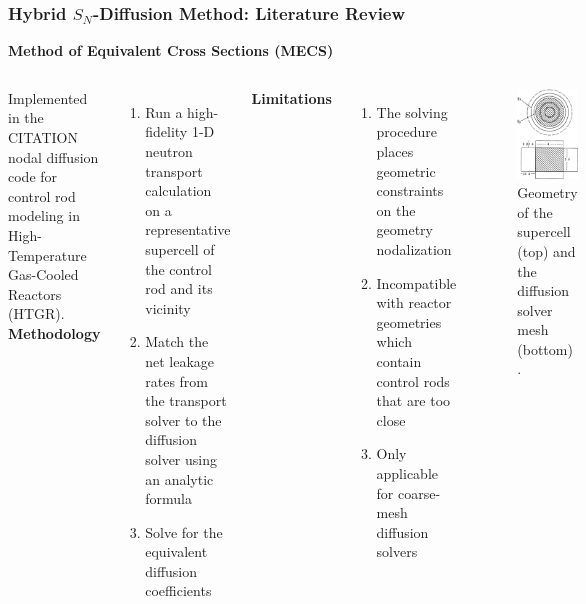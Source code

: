\begin{frame}
  \frametitle{Hybrid $S_N$-Diffusion Method: Literature Review}
  \textbf{Method of Equivalent Cross Sections (MECS)}
  \begin{columns}
    \column[t]{7cm}
    Implemented in the CITATION nodal diffusion code for control rod modeling in High-Temperature
    Gas-Cooled Reactors (HTGR). \\
    \textbf{Methodology}
    \begin{enumerate}
      \item Run a high-fidelity 1-D neutron transport calculation on a representative supercell of
        the control rod and its vicinity
      \item Match the net leakage rates from the transport solver to the diffusion solver using an
        analytic formula
      \item Solve for the equivalent diffusion coefficients
    \end{enumerate}
    \textbf{Limitations}
    \begin{enumerate}
      \item The solving procedure places geometric constraints on the geometry nodalization
      \item Incompatible with reactor geometries which contain control rods that are too close
      \item Only applicable for coarse-mesh diffusion solvers
    \end{enumerate}
    \column[t]{4cm}
    \begin{figure}
      \centering
      \includegraphics[width=.75\columnwidth]{../images/mecs-geometry}
      \caption{Geometry of the supercell (top) and the diffusion solver mesh (bottom)
        \cite{fen_modelling_1992}.}
    \end{figure}
  \end{columns}
\end{frame}

